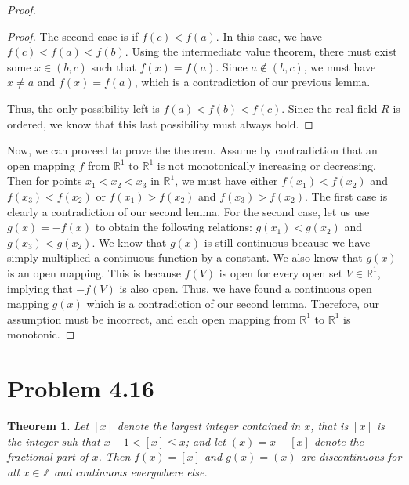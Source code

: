 \documentclass[psamsfonts]{amsart}
\newtheorem{thm}{Theorem}[section]
\theoremstyle{definition}
\theoremstyle{remark}
\numberwithin{equation}{section}
\begin{document}
\begin{proof}
\begin{proof}
The second case is if $f(c) < f(a)$. In this case, we have $f(c) < f(a) < f(b)$. Using the intermediate value theorem, there must exist some $x \in (b,c)$ such that $f(x) = f(a)$. Since $a \notin (b,c)$, we must have $x \neq a$ and $f(x) = f(a)$, which is a contradiction of our previous lemma.

Thus, the only possibility left is $f(a) < f(b) < f(c)$. Since the real field $R$ is ordered, we know that this last possibility must always hold.
\end{proof}

Now, we can proceed to prove the theorem. Assume by contradiction that an open mapping $f$ from $\mathbb{R}^1$ to $\mathbb{R}^1$ is not monotonically increasing or decreasing. Then for points $x_1 < x_2 < x_3$ in $\mathbb{R}^1$, we must have either $f(x_1) < f(x_2)$ and $f(x_3) < f(x_2)$ or $f(x_1) > f(x_2)$ and $f(x_3) > f(x_2)$. The first case is clearly a contradiction of our second lemma. For the second case, let us use $g(x) = -f(x)$ to obtain the following relations: $g(x_1) < g(x_2)$ and $g(x_3) < g(x_2)$. We know that $g(x)$ is still continuous because we have simply multiplied a continuous function by a constant. We also know that $g(x)$ is an open mapping. This is because $f(V)$ is open for every open set $V \in \mathbb{R}^1$, implying that $-f(V)$ is also open. Thus, we have found a continuous open mapping $g(x)$ which is a contradiction of our second lemma. Therefore, our assumption must be incorrect, and each open mapping from $\mathbb{R}^1$ to $\mathbb{R}^1$ is monotonic. 
\end{proof}

\section{Problem 4.16}

\begin{thm}
Let $[x]$ denote the largest integer contained in $x$, that is $[x]$ is the integer suh that $x-1 < [x] \leq x$; and let $(x) = x - [x]$ denote the fractional part of $x$. Then $f(x) = [x]$ and $g(x) = (x)$ are discontinuous for all $x \in \mathbb{Z}$ and continuous everywhere else.
\end{thm}
\end{document}
